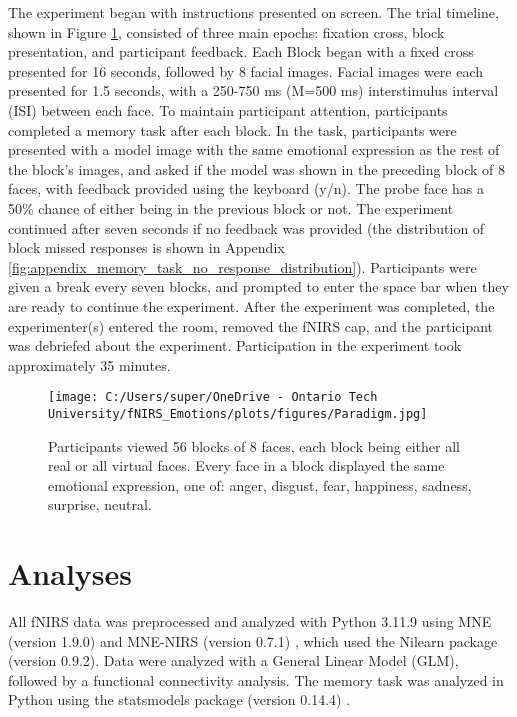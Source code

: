The experiment began with instructions presented on screen. 
The trial timeline, shown in Figure \ref{fig:paradigm}, consisted of three main epochs: fixation cross, block presentation, and participant feedback. 
Each Block began with a fixed cross presented for 16 seconds, followed by 8 facial images. 
Facial images were each presented for 1.5 seconds, with a 250-750 ms (M=500 ms) interstimulus interval (ISI) between each face. 
To maintain participant attention, participants completed a memory task after each block. 
In the task, participants were presented with a model image with the same emotional expression as the rest of the block's images, and asked if the model was shown in the preceding block of 8 faces, with feedback provided using the keyboard (y/n). 
The probe face has a 50\% chance of either being in the previous block or not. 
The experiment continued after seven seconds if no feedback was provided (the distribution of block missed responses is shown in Appendix \ref{fig:appendix_memory_task_no_response_distribution}).
Participants were given a break every seven blocks, and prompted to enter the space bar when they are ready to continue the experiment. 
After the experiment was completed, the experimenter(s) entered the room, removed the fNIRS cap, and the participant was debriefed about the experiment. 
Participation in the experiment took approximately 35 minutes.

\begin{figure}[H]
    \centering
    \texttt{[image: C:/Users/super/OneDrive - Ontario Tech University/fNIRS\_Emotions/plots/figures/Paradigm.jpg]}
    \caption[Experimental paradigm overview]{Participants viewed 56 blocks of 8 faces, each block being either all real or all virtual faces.
    Every face in a block displayed the same emotional expression, one of: anger, disgust, fear, happiness, sadness, surprise, neutral. }
    \label{fig:paradigm}
\end{figure}

\section{Analyses}
All fNIRS data was preprocessed and analyzed with Python 3.11.9 using MNE (version 1.9.0) \citep{gramfort_meg_2013} and MNE-NIRS (version 0.7.1) \citep{luke_analysis_2021}, which used the Nilearn package (version 0.9.2). 
Data were analyzed with a General Linear Model (GLM), followed by a functional connectivity analysis.
The memory task was analyzed in Python using the statsmodels package (version 0.14.4) \citep{seabold2010statsmodels}. 

